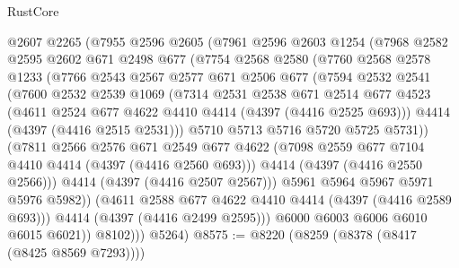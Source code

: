 \begin{lexlean}{RustCore}
\begin{coremodule}
            @2607
            @2265
            (@7955
              @2596
              @2605
              (@7961
                @2596
                @2603
                @1254
                (@7968
                  @2582
                  @2595
                  @2602
                  @671
                  @2498
                  @677
                  (@7754
                    @2568
                    @2580
                    (@7760
                      @2568
                      @2578
                      @1233
                      (@7766
                        @2543
                        @2567
                        @2577
                        @671
                        @2506
                        @677
                        (@7594
                          @2532
                          @2541
                          (@7600
                            @2532
                            @2539
                            @1069
                            (@7314
                              @2531
                              @2538
                              @671
                              @2514
                              @677
                              @4523
                              (@4611 @2524 @677 @4622 @4410 @4414 (@4397 (@4416 @2525 @693)))
                              @4414
                              (@4397 (@4416 @2515 @2531)))
                            @5710
                            @5713
                            @5716
                            @5720
                            @5725
                            @5731))
                        (@7811
                          @2566
                          @2576
                          @671
                          @2549
                          @677
                          @4622
                          (@7098 @2559 @677 @7104 @4410 @4414 (@4397 (@4416 @2560 @693)))
                          @4414
                          (@4397 (@4416 @2550 @2566)))
                        @4414
                        (@4397 (@4416 @2507 @2567)))
                      @5961
                      @5964
                      @5967
                      @5971
                      @5976
                      @5982))
                  (@4611 @2588 @677 @4622 @4410 @4414 (@4397 (@4416 @2589 @693)))
                  @4414
                  (@4397 (@4416 @2499 @2595)))
                @6000
                @6003
                @6006
                @6010
                @6015
                @6021))
            @8102)))
      @5264)
@8575 := @8220 (@8259 (@8378 (@8417 (@8425 @8569 @7293))))

\end{coremodule}
\end{lexlean}
